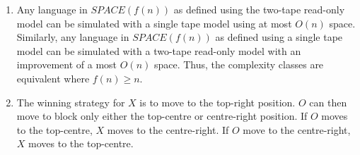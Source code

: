 \documentclass[11pt]{article}
\begin{document}
\begin{enumerate}[8.1]
  \item Any language in $SPACE(f(n))$ as defined using the two-tape read-only model can be simulated with a single tape model using at most $O(n)$ space. Similarly, any language in $SPACE(f(n))$ as defined using a single tape model can be simulated with a two-tape read-only model with an improvement of a most $O(n)$ space. Thus, the complexity classes are equivalent where $f(n) \geq n$. 
  \item The winning strategy for $X$ is to move to the top-right position. $O$ can then move to block only either the top-centre or centre-right position. If $O$ moves to the top-centre, $X$ moves to the centre-right. If $O$ move to the centre-right, $X$ moves to the top-centre.
\end{enumerate}   
\end{document}
